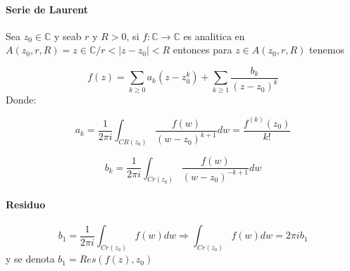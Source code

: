 \documentclass[10pt]{article}
\begin{document}
\paragraph{Serie de Laurent}

Sea $z_0 \in \mathbb{C}$ y seab $r$ y $R > 0$, si $f: \mathbb{C} \rightarrow \mathbb{C}$ es analitica en $A(z_0,r,R) = {z\in \mathbb{C} / r<|z-z_0|<R}$ entonces para $z\in A(z_0,r,R)$ tenemos

\begin{equation*}
	f(z) = \sum_{k \geq 0} a_k(z-z_0^k) + \sum_{k \geq 1} \dfrac{b_k}{(z-z_0)^k}
\end{equation*} 
Donde:

\begin{equation*}
	a_k = \frac{1}{2\pi i} \int_{CR(z_0)} \dfrac{f(w)}{(w-z_0)^{k+1}}dw = \dfrac{f^{(k)}(z_0)}{k!}
\end{equation*}

\begin{equation*}
	b_k = \frac{1}{2\pi i} \int_{Cr(z_0)} \dfrac{f(w)}{(w-z_0)^{-k+1}}dw
\end{equation*}

\paragraph{Residuo}
\begin{equation*}
	b_1 = \frac{1}{2\pi i} \int_{Cr(z_0)} f(w)dw \Rightarrow \int_{Cr(z_0)}f(w)dw = 2\pi i b_1
\end{equation*}
y se denota $b_1 = Res(f(z), z_0)$
\end{document}
